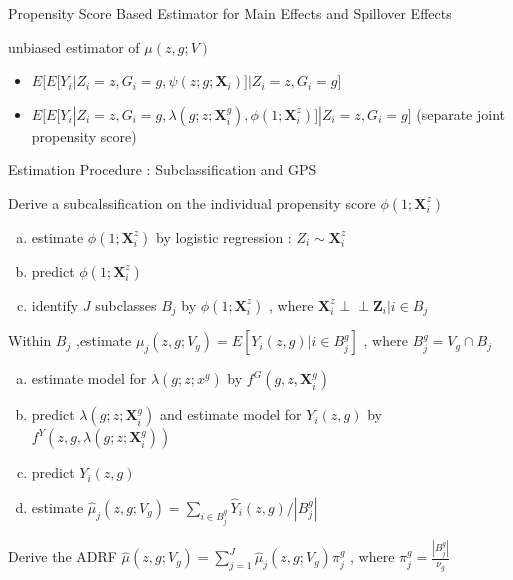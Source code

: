 \documentclass[notes,11pt, aspectratio=169]{beamer}
\begin{document}
\begin{frame}{Propensity Score Based Estimator for Main Effects and Spillover Effects}
\begin{block}{unbiased estimator of $\mu(z,g;V)$}
\begin{itemize}
    \item $E \Big[ E[Y_i|Z_i=z,G_i=g,\psi(z;g;\mathbf{X}_i)]|Z_i=z,G_i=g \Big]$
    \item $E \Big[ E[Y_i|Z_i=z,G_i=g,\lambda(g;z;\mathbf{X}_{i}^g), \phi(1;\mathbf{X}_{i}^z)]|Z_i=z,G_i=g \Big]$ (separate joint propensity score)
\end{itemize}   
\end{block}
\end{frame}




\begin{frame}{Estimation Procedure : Subclassification and GPS}
\begin{wideitemize}
    \item Derive a subcalssification on the individual propensity score $\phi(1;\mathbf{X}_{i}^{z})$
    \begin{enumerate}[(a)]
      \item estimate  $\phi(1;\mathbf{X}_{i}^{z})$ by logistic regression : $Z_i \sim \mathbf{X}_i^z$
      \item predict $\phi(1;\mathbf{X}_{i}^{z})$
      \item identify $J$ subclasses $B_j$ by $\phi(1;\mathbf{X}_{i}^{z})$ , where $\mathbf{X}_i^z \perp\!\!\!\perp \mathbf{Z}_i| i \in B_j$
    \end{enumerate}
    \item Within $B_j$ ,estimate $\mu_j(z,g;V_g)=E[Y_i(z,g)|i \in B_j^g]$ , where $B_j^g=V_g \cap B_j$
    \begin{enumerate}[(a)]
       \item estimate model for $\lambda(g;z;x^g)$ by $f^G(g,z,\mathbf{X}_i^g)$
       \item predict $\lambda(g;z;\mathbf{X}_i^g)$ and estimate model for $Y_i(z,g)$ by $f^{Y}(z,g,\lambda(g;z;\mathbf{X}_i^g))$
       \item predict  $Y_i(z,g)$
       \item estimate $\hat{\mu}_j(z,g;V_g)=\sum_{i \in B_j^g} \hat{Y}_i(z,g) / {|B_j^g|}$
    \end{enumerate}
%
    \item Derive the ADRF
$\hat{\mu}(z,g;V_g)=\sum_{j=1}^{J} \hat{\mu}_j(z,g;V_g) \pi_j^g$ , where $\pi_{j}^{g}=\frac{|B_j^g|}{\nu_g}$
%
\end{wideitemize}
\end{frame}
\end{document}
